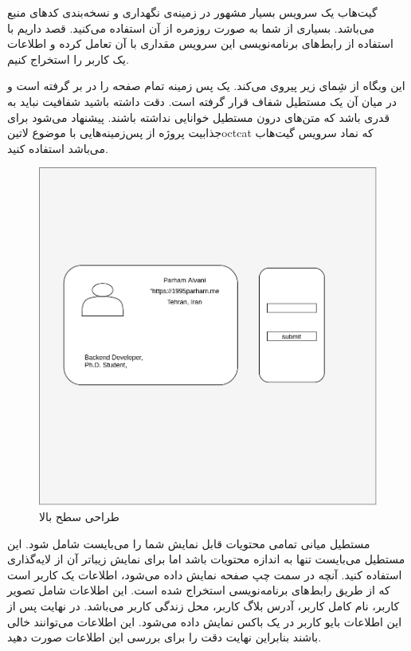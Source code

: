 \documentclass[../main.tex]{subfiles}
\begin{document}

گیت‌هاب یک سرویس بسیار مشهور در زمینه‌ی نگهداری و نسخه‌بندی کدهای منبع می‌باشد. بسیاری از شما به صورت روزمره از آن استفاده می‌کنید.
قصد داریم با استفاده از رابط‌های برنامه‌نویسی این سرویس مقداری با آن تعامل کرده و اطلاعات یک کاربر را استخراج کنیم.

این وبگاه از شِمای زیر پیروی می‌کند. یک پس زمینه تمام صفحه را در بر گرفته است و در میان آن یک مستطیل شفاف قرار گرفته است.
دقت داشته باشید شفافیت نباید به قدری باشد که متن‌های درون مستطیل خوانایی نداشته باشند.
پیشنهاد می‌شود برای جذابیت پروژه از پس‌زمینه‌هایی با موضوع ‌لاتین{octcat} که نماد سرویس گیت‌هاب می‌باشد استفاده کنید.

\begin{figure}[h]
  \centering
  \includegraphics[scale=0.25]{./github}
  \caption{طراحی سطح بالا}
\end{figure}

مستطیل میانی تمامی محتویات قابل نمایش شما را می‌بایست شامل شود. این مستطیل می‌بایست تنها به اندازه محتویات باشد اما برای نمایش زیباتر آن از لایه‌گذاری استفاده کنید.
آنچه در سمت چپ صفحه نمایش داده می‌شود، اطلاعات یک کاربر است که از طریق رابط‌های برنامه‌نویسی استخراج شده است. این اطلاعات شامل تصویر کاربر،
نام کامل کاربر، آدرس بلاگ کاربر، محل زندگی کاربر می‌باشد.
در نهایت پس از این اطلاعات بایو کاربر در یک باکس نمایش داده می‌شود.
این اطلاعات می‌توانند خالی باشند بنابراین نهایت دقت را برای بررسی این اطلاعات صورت دهید.
\end{document}
